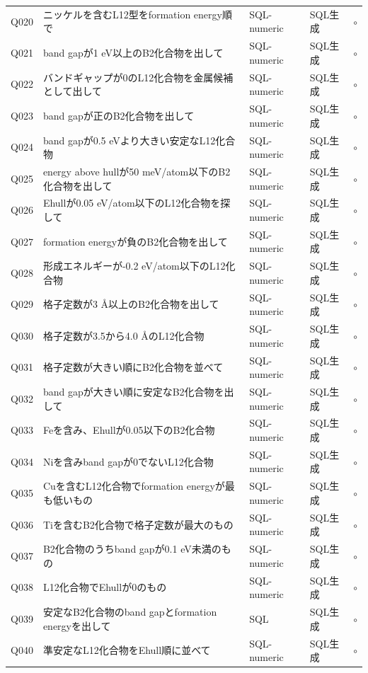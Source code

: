 \documentclass[3p]{elsarticle}
\begin{document}
\begin{longtable}{lp{5cm}llc}
  Q020 & ニッケルを含むL12型をformation energy順で & SQL-numeric & SQL生成 & $\circ$ \\
  Q021 & band gapが1 eV以上のB2化合物を出して & SQL-numeric & SQL生成 & $\circ$ \\
  Q022 & バンドギャップが0のL12化合物を金属候補として出して & SQL-numeric & SQL生成 & $\circ$ \\
  Q023 & band gapが正のB2化合物を出して & SQL-numeric & SQL生成 & $\circ$ \\
  Q024 & band gapが0.5 eVより大きい安定なL12化合物 & SQL-numeric & SQL生成 & $\circ$ \\
  Q025 & energy above hullが50 meV/atom以下のB2化合物を出して & SQL-numeric & SQL生成 & $\circ$ \\
  Q026 & Ehullが0.05 eV/atom以下のL12化合物を探して & SQL-numeric & SQL生成 & $\circ$ \\
  Q027 & formation energyが負のB2化合物を出して & SQL-numeric & SQL生成 & $\circ$ \\
  Q028 & 形成エネルギーが-0.2 eV/atom以下のL12化合物 & SQL-numeric & SQL生成 & $\circ$ \\
  Q029 & 格子定数が3 Å以上のB2化合物を出して & SQL-numeric & SQL生成 & $\circ$ \\
  Q030 & 格子定数が3.5から4.0 ÅのL12化合物 & SQL-numeric & SQL生成 & $\circ$ \\
  Q031 & 格子定数が大きい順にB2化合物を並べて & SQL-numeric & SQL生成 & $\circ$ \\
  Q032 & band gapが大きい順に安定なB2化合物を出して & SQL-numeric & SQL生成 & $\circ$ \\
  Q033 & Feを含み、Ehullが0.05以下のB2化合物 & SQL-numeric & SQL生成 & $\circ$ \\
  Q034 & Niを含みband gapが0でないL12化合物 & SQL-numeric & SQL生成 & $\circ$ \\
  Q035 & Cuを含むL12化合物でformation energyが最も低いもの & SQL-numeric & SQL生成 & $\circ$ \\
  Q036 & Tiを含むB2化合物で格子定数が最大のもの & SQL-numeric & SQL生成 & $\circ$ \\
  Q037 & B2化合物のうちband gapが0.1 eV未満のもの & SQL-numeric & SQL生成 & $\circ$ \\
  Q038 & L12化合物でEhullが0のもの & SQL-numeric & SQL生成 & $\circ$ \\
  Q039 & 安定なB2化合物のband gapとformation energyを出して & SQL & SQL生成 & $\circ$ \\
  Q040 & 準安定なL12化合物をEhull順に並べて & SQL-numeric & SQL生成 & $\circ$ \\

\end{longtable}
\end{document}

